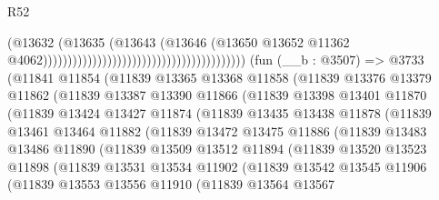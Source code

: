 \begin{lexlean}{R52}
\begin{coremodule}
                                                                            (@13632
                                                                              (@13635
                                                                                (@13643
                                                                                  (@13646
                                                                                    (@13650
                                                                                      @13652
                                                                                      @11362
                                                                                      @4062)))))))))))))))))))))))))))))))))))))))))
    (fun (__b : @3507) =>
    @3733
      (@11841
        @11854
        (@11839
          @13365
          @13368
          @11858
          (@11839
            @13376
            @13379
            @11862
            (@11839
              @13387
              @13390
              @11866
              (@11839
                @13398
                @13401
                @11870
                (@11839
                  @13424
                  @13427
                  @11874
                  (@11839
                    @13435
                    @13438
                    @11878
                    (@11839
                      @13461
                      @13464
                      @11882
                      (@11839
                        @13472
                        @13475
                        @11886
                        (@11839
                          @13483
                          @13486
                          @11890
                          (@11839
                            @13509
                            @13512
                            @11894
                            (@11839
                              @13520
                              @13523
                              @11898
                              (@11839
                                @13531
                                @13534
                                @11902
                                (@11839
                                  @13542
                                  @13545
                                  @11906
                                  (@11839
                                    @13553
                                    @13556
                                    @11910
                                    (@11839
                                      @13564
                                      @13567

\end{coremodule}
\end{lexlean}
